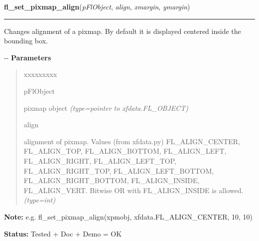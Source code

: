 \hspace{.8\funcindent}\begin{boxedminipage}{\funcwidth}

    \raggedright \textbf{fl\_set\_pixmap\_align}(\textit{pFlObject}, \textit{align}, \textit{xmargin}, \textit{ymargin})

    \vspace{-1.5ex}

    \rule{\textwidth}{0.5\fboxrule}
\setlength{\parskip}{2ex}

Changes alignment of a pixmap. By default it is displayed centered
inside the bounding box.

-{}-
\setlength{\parskip}{1ex}
      \textbf{Parameters}
      \vspace{-1ex}

      \begin{quote}
        \begin{Ventry}{xxxxxxxxx}

          \item[pFlObject]


pixmap object
            {\it (type=pointer to xfdata.FL\_OBJECT)}

          \item[align]


alignment of pixmap. Values (from xfdata.py) FL\_ALIGN\_CENTER,
FL\_ALIGN\_TOP, FL\_ALIGN\_BOTTOM, FL\_ALIGN\_LEFT, FL\_ALIGN\_RIGHT,
FL\_ALIGN\_LEFT\_TOP, FL\_ALIGN\_RIGHT\_TOP, FL\_ALIGN\_LEFT\_BOTTOM,
FL\_ALIGN\_RIGHT\_BOTTOM, FL\_ALIGN\_INSIDE, FL\_ALIGN\_VERT.
Bitwise OR with FL\_ALIGN\_INSIDE is allowed.
            {\it (type=int)}

        \end{Ventry}

      \end{quote}

\textbf{Note:} 
e.g. fl\_set\_pixmap\_align(xpmobj, xfdata.FL\_ALIGN\_CENTER, 10, 10)


\textbf{Status:} 
Tested + Doc + Demo = OK


    \end{boxedminipage}

    \label{xformslib:flbitmap:fl_set_pixmap_align}

    \vspace{0.5ex}

